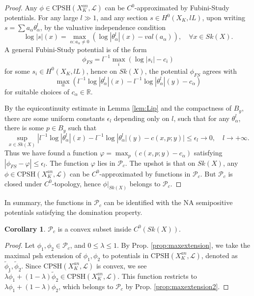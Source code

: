 \documentclass[a4paper]{article}
\theoremstyle{definition}
\newtheorem{cor}[thm]{Corollary}
\newcommand{\R}{\mathbb{R}}
\begin{document}
	
	\begin{proof}
	Any $\phi\in  \text{CPSH}(X_K^{an},\mathcal{L})$ can be $C^0$-approximated by Fubini-Study potentials. For any large $l\gg 1$, and any section $s\in H^0(X_K, lL)$, upon writing $s=\sum a_\alpha \theta_\alpha^l$, by the valuative independence condition
	\[
	\log |s| (x)= \max_{\alpha: a_\alpha\neq 0} (\log |\theta_\alpha^l|(x)- val(a_\alpha)),\quad \forall x\in Sk(X).
	\]
	A general Fubini-Study potential is of the form
	\[
	\phi_{FS}=l^{-1}\max_i (  \log |s_i|- c_i)
	\]
	for  some $s_i\in H^0(X_K, lL)$, 
hence  on $Sk(X)$, the potential  $\phi_{FS}$  agrees with 
	\[
	\max_\alpha (l^{-1}\log |\theta_\alpha^l|(x)-   l^{-1}\log |\theta_\alpha^l|(y) -     c_\alpha)
	\]
	for suitable choices of $c_\alpha\in \R$. 
	
	
	
By the equicontinuity estimate in  Lemma \ref{lem:Lip} and the compactness of $B_y$, there are some uniform constants $\epsilon_l$ depending only on $l$, such that for any $\theta_\alpha^l$, there is some $p\in B_y$ such that
	\[
	\sup_{x\in Sk(X)} | l^{-1} \log |\theta_\alpha^l |(x)-  l^{-1}\log |\theta_\alpha^l|(y) -c(x,p;y) |\leq \epsilon_l \to 0,\quad l\to +\infty.
	\]
Thus we have found a function $\varphi=   \max_p( c(x,p;y)- c_\alpha) $ satisfying 
$
	|\phi_{FS} - \varphi| \leq \epsilon_l.
$
	The function $\varphi$ lies in $\mathcal{P}_c$. The upshot is that on $Sk(X)$, any $\phi\in  \text{CPSH}(X_K^{an},\mathcal{L})$ can be $C^0$-approximated by functions in $\mathcal{P}_c$. But $\mathcal{P}_c$ is closed under $C^0$-topology, hence $\phi|_{Sk(X)}$ belongs to $\mathcal{P}_c$.
	\end{proof}
	
	

	
	
	
In summary, the functions in $\mathcal{P}_c$ can be identified with the NA semipositive potentials satisfying the domination property.
	
	
	
		\begin{cor}\label{cor:Pcconvex}
	 $\mathcal{P}_c$ is a convex subset  inside $C^0(Sk(X))$.
	\end{cor}
	
	
	\begin{proof}
	Let $\phi_1,\phi_2\in \mathcal{P}_c$, and $0\leq \lambda\leq 1$. By Prop. \ref{prop:maxextension}, we take the maximal  psh extension of $\phi_1, \phi_2$ to potentials in $\text{CPSH}(X_K^{an},\mathcal{L})$, denoted as $\tilde{\phi}_1, \tilde{\phi}_2$. Since $\text{CPSH}(X_K^{an},\mathcal{L})$ is convex, we see $\lambda \tilde{\phi}_1+(1-\lambda)\tilde{\phi}_2\in \text{CPSH}(X_K^{an},\mathcal{L})$. This function restricts to $\lambda \phi_1+(1-\lambda)\phi_2$, which belongs to $\mathcal{P}_c$ by Prop. \ref{prop:maxextension2}.
	\end{proof}
	
\end{document}
